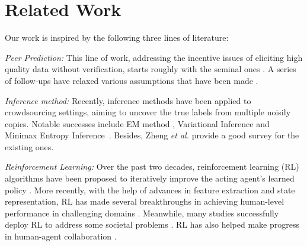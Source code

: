\documentclass{article}
\newcommand{\com}[1]{\textbf{\color{red}(COMMENT: #1)}} %
\newcommand{\com}[1]{}
\begin{document}
\section{Related Work}
\label{section: related work}
Our work is inspired by the following three lines of literature:

\emph{Peer Prediction:} This line of work, addressing the incentive issues of eliciting high quality data without verification, starts roughly with the seminal ones \cite{prelec2004bayesian,gneiting2007strictly}. A series of follow-ups have relaxed various assumptions that have been made \cite{jurca2009mechanisms,witkowski2012peer,radanovic2013robust,dasgupta2013crowdsourced}. 

\emph{Inference method:} Recently, inference methods have been applied to crowdsourcing settings, aiming to uncover the true labels from multiple noisily copies. Notable successes include EM method \cite{dawid1979maximum,raykar2010learning,zhang2014spectral}, Variational Inference \cite{liu2012variational,chen2015statistical} and Minimax Entropy Inference~\cite{zhou2012learning,zhou2014aggregating}. Besides, Zheng \textit{et al.} \cite{zheng2017truth} provide a good survey for the existing ones.

\emph{Reinforcement Learning:} Over the past two decades, reinforcement learning (RL) algorithms have been proposed to iteratively improve the acting agent's learned policy \cite{Watkins92, Tesauro95, Sutton98, Gordon00, Szepesvari10}. More recently, with the help of advances in feature extraction and state representation, RL has made several breakthroughs in achieving human-level performance in challenging domains \cite{Mnih15,Liang16, Hasselt2016DeepRL, Silver17}. Meanwhile, many studies successfully deploy RL to address some societal problems \cite{Yu2013EmotionalMR,Leibo2017}. RL has also helped make progress in human-agent collaboration \cite{engel2005reinforcement, gasic2014gaussian,Sadhu2016ArgusSH,Wang2017}.

\end{document}
